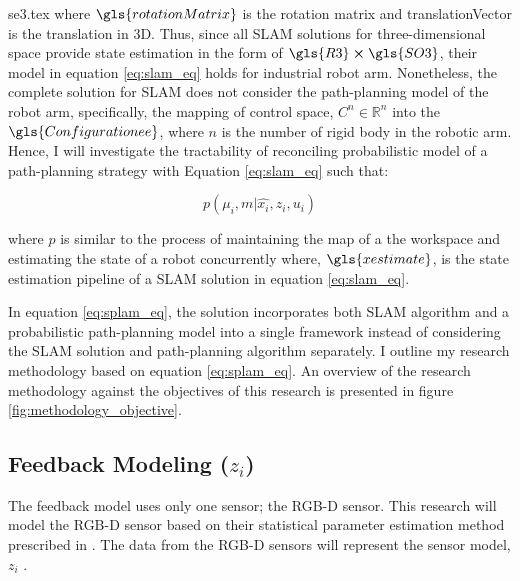 {se3.tex}
where $\gls{rotationMatrix}$ is the rotation matrix and
\gls{translationVector} is the translation in 3D.
Thus, since all SLAM solutions for three-dimensional space provide state estimation in the form of 
$ \gls{R3} \cross \gls{SO3}$, their model in equation 
\ref{eq:slam_eq} holds
for industrial robot arm. 
Nonetheless, the complete solution for SLAM does not consider 
the path-planning model of the robot arm, specifically, 
the mapping of control space,
${C}^n \in \mathbb{R}^n$ into the $\gls{Configurationee}$, where 
$n$ is the number of rigid body in the robotic arm. 
Hence, I will investigate the tractability of reconciling
probabilistic model of a path-planning strategy
with Equation \ref{eq:slam_eq} such that:

\begin{equation} \label{eq:splam_eq}
  p(\mu_i,m | \hat{x_i},z_i,u_i)
\end{equation}

where $p$ is similar to the process of maintaining the map 
of a the workspace and estimating the
state of a robot concurrently where, $\gls{xestimate}$, 
is the state estimation 
pipeline of a SLAM solution in equation \ref{eq:slam_eq}.

In equation \ref{eq:splam_eq}, the solution incorporates both 
SLAM algorithm and a probabilistic path-planning
model into a single framework instead of considering the SLAM 
solution and path-planning algorithm separately. 
I outline my research methodology based on equation \ref{eq:splam_eq}. An overview of the research methodology against 
the objectives of this research is presented in figure \ref{fig:methodology_objective}.


\iffalse

\subsection{Feedback Modeling ($z_i$)}\label{feedback_modeling_methodology}
The feedback model uses only one sensor; the RGB-D sensor. This
research will model the RGB-D sensor based on their statistical parameter 
estimation method
prescribed in \textcite{Iman2016}.
The data from the RGB-D sensors will represent the sensor model, $z_i$ .

